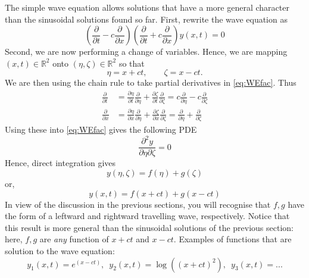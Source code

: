 The simple wave equation allows solutions that have a more general character than the sinusoidal solutions found so far. First, rewrite the wave equation as
\begin{equation}\label{eq:WEfac}
\left( \frac{\partial}{\partial t} - c  \frac{\partial}{\partial x}\right)\left( \frac{\partial}{\partial t} + c  \frac{\partial}{\partial x}\right) y(x,t) = 0
\end{equation}
Second, we are now performing a change of variables. Hence, we are mapping $(x,t) \in \mathbb{R}^2$ onto $(\eta,\zeta) \in \mathbb{R}^2$ so that
\begin{equation}
\eta = x + ct, \qquad  \zeta = x - ct.
\end{equation}
We are then using the chain rule to take partial derivatives in \eqref{eq:WEfac}. Thus
\begin{subequations}
\begin{align}
\frac{\partial}{\partial t} &= \frac{\partial \eta}{\partial t}\frac{\partial }{\partial \eta} + \frac{\partial \zeta}{\partial t}\frac{\partial }{\partial \zeta} = c \frac{\partial }{\partial \eta} - c \frac{\partial }{\partial \zeta} \\
\frac{\partial}{\partial x} &= \frac{\partial \eta}{\partial x}\frac{\partial }{\partial \eta} + \frac{\partial \zeta}{\partial x}\frac{\partial }{\partial \zeta} = \frac{\partial }{\partial \eta} + \frac{\partial }{\partial \zeta} 
\end{align}
\end{subequations}
Using these into \eqref{eq:WEfac} gives the following PDE 
\begin{equation}
\frac{\partial^2y}{\partial \eta \partial \zeta}  = 0
\end{equation}
Hence, direct integration gives
\begin{equation}
y(\eta,\zeta) = f(\eta) + g(\zeta) 
\end{equation}
or,
\begin{equation}\label{eq:Dalem}
y(x,t) = f(x+ct) + g(x-ct)
\end{equation}
In view of the discussion in the previous sections, you will recognise that $f,g$ have the form of a leftward and rightward travelling wave, respectively. Notice that this result is more general than the sinusoidal solutions of the previous section: here, $f,g$ are \emph{any} function of $x+ct$ and $x-ct$. Examples of functions that are solution to the wave equation:
\begin{equation}\label{eq:WEsolsEx}
y_1(x,t) = e^{(x-ct)}, \,\,\, y_2(x,t) = \log \left( (x+ct)^2 \right), \,\,\, y_3(x,t) =  ...
\end{equation}
